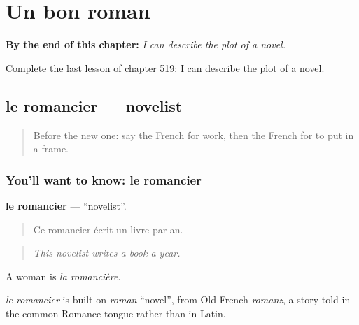 
\chapter{Un bon roman}
\label{ch:fr-un-bon-roman}

\begin{chapteropening}
\textbf{By the end of this chapter:} \emph{I can describe the plot of a novel.}

Complete the last lesson of chapter 519: I can describe the plot of a novel.
\end{chapteropening}

\section[le romancier]{le romancier — novelist}

\label{lesson:FR-C519-romancier}



\begin{quote}
Before the new one: say the French for work, then the French for to put in a frame.
\end{quote}

\subsection*{You'll want to know: le romancier}
\textbf{le romancier} — \textquotedblleft{}novelist\textquotedblright{}.

\begin{quote}
Ce romancier écrit un livre par an.
\end{quote}

\begin{quote}
\emph{This novelist writes a book a year.}
\end{quote}

A woman is \emph{la romancière}.

\begin{cousinweb}
\emph{le romancier} is built on \emph{roman} \textquotedblleft{}novel\textquotedblright{}, from Old French \emph{romanz}, a story told in the common Romance tongue rather than in Latin.
\end{cousinweb}

